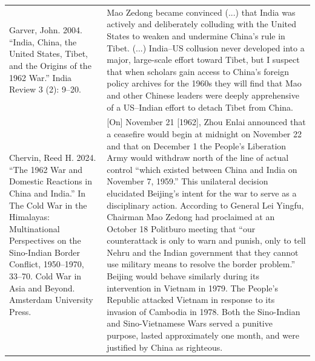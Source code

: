 {\begin{longtable}{p{}p{}}
\\
Garver, John. 2004. “India, China, the United States, Tibet, and the Origins of the 1962 War.” India Review 3 (2): 9–20. & Mao Zedong became convinced (...) that India was actively and deliberately colluding with the United States to weaken and undermine China's rule in Tibet. (...) India–US collusion never developed into a major, large-scale effort toward Tibet, but I suspect that when scholars gain access to China's foreign policy archives for the 1960s they will find that Mao and other Chinese leaders were deeply apprehensive of a US–Indian effort to detach Tibet from China.
\\
Chervin, Reed H. 2024. “The 1962 War and Domestic Reactions in China and India.” In The Cold War in the Himalayas: Multinational Perspectives on the Sino-Indian Border Conflict, 1950–1970, 33–70. Cold War in Asia and Beyond. Amsterdam University Press. & [On] November 21 [1962], Zhou Enlai announced that a ceasefire would begin at midnight on November 22 and that on December 1 the People's Liberation Army would withdraw north of the line of actual control “which existed between China and India on November 7, 1959.” This unilateral decision elucidated Beijing's intent for the war to serve as a disciplinary action. According to General Lei Yingfu, Chairman Mao Zedong had proclaimed at an October 18 Politburo meeting that “our counterattack is only to warn and punish, only to tell Nehru and the Indian government that they cannot use military means to resolve the border problem.” Beijing would behave similarly during its intervention in Vietnam in 1979. The People's Republic attacked Vietnam in response to its invasion of Cambodia in 1978. Both the Sino-Indian and Sino-Vietnamese Wars served a punitive purpose, lasted approximately one month, and were justified by China as righteous.
\\

\end{longtable}}
